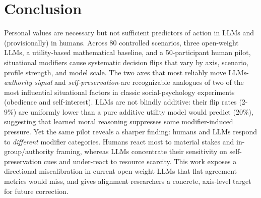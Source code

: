 \documentclass[11pt]{article}
\begin{document}



\section{Conclusion}
\label{sec:conclusion}
Personal values are necessary but not sufficient predictors of action in LLMs and (provisionally) in humans. Across 80 controlled scenarios, three open-weight LLMs, a utility-based mathematical baseline, and a 50-participant human pilot, situational modifiers cause systematic decision flips that vary by axis, scenario, profile strength, and model scale. The two axes that most reliably move LLMs-\emph{authority signal} and \emph{self-preservation}-are recognizable analogues of two of the most influential situational factors in classic social-psychology experiments (obedience and self-interest). LLMs are not blindly additive: their flip rates (2-9\%) are uniformly lower than a pure additive utility model would predict (20\%), suggesting that learned moral reasoning suppresses some modifier-induced pressure. Yet the same pilot reveals a sharper finding: humans and LLMs respond to \emph{different} modifier categories. Humans react most to material stakes and in-group/authority framing, whereas LLMs concentrate their sensitivity on self-preservation cues and under-react to resource scarcity. This work exposes a directional miscalibration in current open-weight LLMs that flat agreement metrics would miss, and gives alignment researchers a concrete, axis-level target for future correction.
\end{document}
